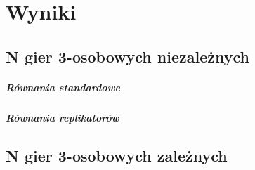 \chapter{Wyniki}
\label{cha:wyniki}

\section{N gier 3-osobowych niezależnych}
\label{sec:N3nzal}

\paragraph{Równania standardowe}
\label{sec:r_stan}

\paragraph{Równania replikatorów}
\label{sec:r_repl}

\section{N gier 3-osobowych zależnych}
\label{sec:N3zal}